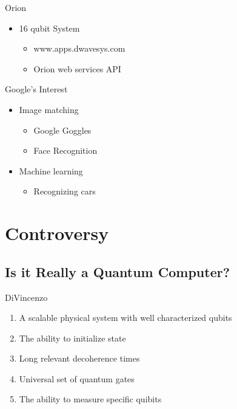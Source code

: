 \documentclass{beamer}
\begin{document}
\begin{frame}{Orion}
\begin{itemize}
  \item 16 qubit System
  \begin{itemize}
   \item www.apps.dwavesys.com
   \item Orion web services API
  \end{itemize}

 \end{itemize}

\end{frame}

\begin{frame}{Google's Interest}
 \begin{itemize}
  \item Image matching
  \begin{itemize}
   \item Google Goggles
   \item Face Recognition
  \end{itemize}
  \item Machine learning
  \begin{itemize}
   \item Recognizing cars
  \end{itemize}

 \end{itemize}

\end{frame}

\section{Controversy}

\subsection{Is it Really a Quantum Computer?}

\begin{frame}{DiVincenzo}
 \begin{enumerate}
  \item A scalable physical system with well characterized qubits
  \pause
  \item The ability to initialize state
  \pause
  \item Long relevant decoherence times
  \pause
  \item Universal set of quantum gates
  \pause
  \item The ability to measure specific quibits
 \end{enumerate}

\end{frame}
\end{document}
